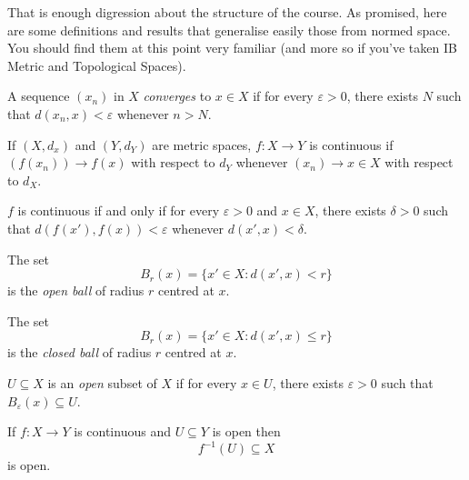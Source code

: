 \documentclass[a4paper]{article}
\theoremstyle{definition}
\begin{document}
That is enough digression about the structure of the course. As promised, here are some definitions and results that generalise easily those from normed space. You should find them at this point very familiar (and more so if you've taken IB Metric and Topological Spaces).

\begin{definition}[Convergence]
  A sequence \((x_n)\) in \(X\) \emph{converges} to \(x \in X\) if for every \(\varepsilon > 0\), there exists \(N\) such that \(d(x_n, x) < \varepsilon\) whenever \(n > N\).
\end{definition}

\begin{definition}[Continuity]
  If \((X, d_x)\) and \((Y, d_Y)\) are metric spaces, \(f: X \to Y\) is continuous if \((f(x_n)) \to f(x)\) with respect to \(d_Y\) whenever \((x_n) \to x \in X\) with respect to \(d_X\).
\end{definition}

\begin{proposition}
  \(f\) is continuous if and only if for every \(\varepsilon > 0\) and \(x \in X\), there exists \(\delta > 0\) such that \(d(f(x'), f(x)) < \varepsilon\) whenever \(d(x', x) < \delta\).
\end{proposition}

\begin{definition}
  The set 
  \[
    B_r(x) = \{x' \in X: d(x', x) < r\}
  \]
  is the \emph{open ball} of radius \(r\) centred at \(x\).
\end{definition}

\begin{definition}
 The set
   \[
     B_r(x) = \{x' \in X: d(x', x) \leq r\}
   \]
   is the \emph{closed ball} of radius \(r\) centred at \(x\).
\end{definition}

\begin{definition}
  \(U \subseteq X\) is an \emph{open} subset of \(X\) if for every \(x \in U\), there exists \(\varepsilon > 0\) such that \(B_\varepsilon(x) \subseteq U\).
\end{definition}

\begin{proposition}
  If \(f: X \to Y\) is continuous and \(U \subseteq Y\) is open then
  \[
    f^{-1}(U) \subseteq X
  \]
  is open.
\end{proposition}
\end{document}
